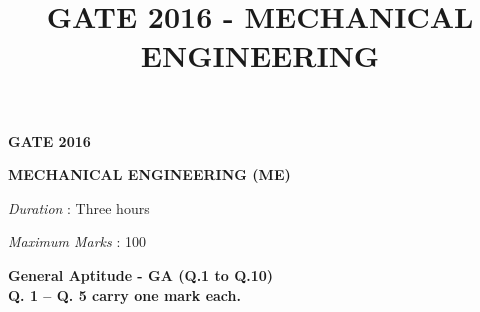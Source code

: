 \documentclass[journal,11pt,onecolumn]{IEEEtran}
\title{GATE 2016 - MECHANICAL ENGINEERING}
\begin{document}
\begin{center}

    \Large

    \textbf{GATE 2016}

    \vspace{0.5cm}

    \textbf{MECHANICAL ENGINEERING (ME)}

\end{center}

\textit{Duration} : Three hours

\hfill

\textit{Maximum Marks} : 100

\large\textbf{General Aptitude - GA (Q.1 to Q.10)}\\

\normalsize\textbf{Q. 1 – Q. 5 carry one mark each.}\\
\end{document}
